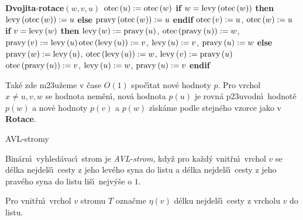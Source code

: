 {\bf Dvojita}-{\bf rotace$\left(w,v,u\right)$\newline 
$\operatorname{otec}\left(u\right):=\operatorname{otec}\left(w\right)$\newline 
if} $w=\operatorname{levy}\left(\operatorname{otec}\left(w\right)\right)$ {\bf then}\newline 
\phantom{---}$\operatorname{levy}\left(\operatorname{otec}\left(w\right)\right):=u$\newline 
{\bf else}\newline 
\phantom{---}$\operatorname{pravy}\left(\operatorname{otec}\left(w\right)\right):=u$\newline 
{\bf endif}\newline 
$\operatorname{otec}\left(v\right):=u$, $\operatorname{otec}\left(w\right):=u$\newline 
{\bf if} $v=\operatorname{levy}\left(w\right)$ {\bf then}\newline  
\phantom{---}$\operatorname{levy}\left(w\right):=\operatorname{pravy}\left(u\right)$, $\operatorname{otec}\left(\operatorname{pravy}\left(u\right)\right):=w$, $\operatorname{pravy}\left(v\right):=\operatorname{levy}\left(u\right)$\newline \phantom{---}$\operatorname{otec}\left(\operatorname{levy}\left(u\right)\right):=v$, $\operatorname{levy}\left(u\right):=v$, $\operatorname{pravy}\left(u\right):=w$\newline 
{\bf else}\newline 
\phantom{---}$\operatorname{pravy}\left(w\right):=\operatorname{levy}\left(u\right)$, $\operatorname{otec}\left(\operatorname{levy}\left(u\right)\right):=w$, $\operatorname{levy}\left(v\right):=\operatorname{pravy}\left(u\right)$\newline 
\phantom{---}$\operatorname{otec}\left(\operatorname{pravy}\left(u\right)\right):=v$, $\operatorname{levy}\left(u\right):=w$, $\operatorname{pravy}\left(u\right):=v$\newline 
{\bf endif}
\medskip

\flushpar Tak\'e zde m\accent23u\v zeme v \v case $O\left(1\right)$ spo\v c\'\i tat nov\'e hodnoty $
p$. 
Pro vrchol $x\ne u,v,w$ se hodnota nem\v en\'\i , nov\'a hodnota 
$p\left(u\right)$ je 
rovn\'a p\accent23uvodn\'\i\ hodnot\v e $p\left(w\right)$ a nov\'e hodnoty $
p\left(v\right)$ 
a $p\left(w\right)$ 
z\'\i sk\'ame pod\-le stejn\'eho vzorce  jako v {\bf Rotace}.

\heading
AVL-stromy
\endheading

\flushpar Bin\'arn\'\i\ vyhled\'avac\'\i\ strom je 
\emph{AVL}-\emph{strom}, kdy\v z pro ka\v zd\'y vnit\v r\-n\'\i\ vrchol 
$v$ se d\'elka nejdel\v s\'\i\ cesty z jeho lev\'eho syna do 
listu a d\'elka nejdel\v s\'\i\ cesty z jeho prav\'eho syna do listu 
li\v s\'\i\ nejv\'y\v se o $1$.  
\medskip

\flushpar Pro vnit\v rn\'\i\ vrchol $v$ stromu $T$ ozna\v cme $\eta 
\left(v\right)$ 
d\'elku nejdel\v s\'\i\ cesty z vrcholu $v$ do listu.
\medskip
 
